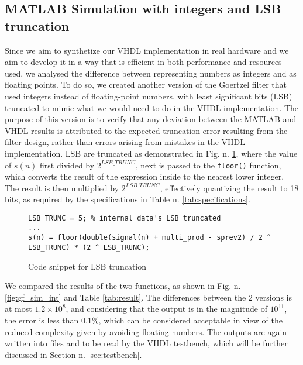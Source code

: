 \subsection{MATLAB Simulation with integers and LSB truncation}  \label{sec:matlab-int}

Since we aim to synthetize our VHDL implementation in real hardware and we aim to develop it in a way that is efficient in both performance and resources used, we analysed the difference between representing numbers as integers and as floating points.
To do so, we created another version of the Goertzel filter that used integers instead of floating-point numbers, with least significant bits (LSB) truncated to mimic what we would need to do in the VHDL implementation. The purpose of this version is to verify that any deviation between the MATLAB and VHDL results is attributed to the expected truncation error resulting from the filter design, rather than errors arising from mistakes in the VHDL implementation.
LSB are truncated as demonstrated in Fig. n. \ref{code:lsb_trunc}, where the value of $s(n)$ first divided by $2^{LSB\_TRUNC}$, next is passed to the \texttt{floor()} function, which converts the result of the expression inside to the nearest lower integer. The result is then multiplied by $2^{LSB\_TRUNC}$, effectively quantizing the result to 18 bits, as required by the specifications in Table n. \ref{tab:specifications}.

\lstset{language=Matlab}
\begin{figure}[H] \begin{lstlisting}
LSB_TRUNC = 5; % internal data's LSB truncated
...
s(n) = floor(double(signal(n) + multi_prod - sprev2) / 2 ^ LSB_TRUNC) * (2 ^ LSB_TRUNC);
\end{lstlisting}
\caption{Code snippet for LSB truncation}
\label{code:lsb_trunc}
\end{figure}

We compared the results of the two functions, as shown in Fig. n. \ref{fig:gf_sim_int} and Table \ref{tab:result}. The differences between the 2 versions is at most $1.2 \times 10^8$, and considering that the output is in the magnitude of $10^{11}$, the error is less than $0.1\%$, which can be considered acceptable in view of the reduced complexity given by avoiding floating numbers.
The outputs are again written into files and to be read by the VHDL testbench, which will be further discussed in Section n. \ref{sec:testbench}.

